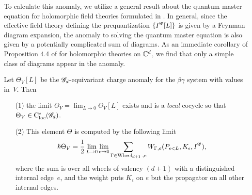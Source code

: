 To calculate this anomaly, we utilize a general result about the quantum master equation for holomorphic field theories formulated in \cite{BWhol}. 
In general, since the effective field theory defining the prequantization $\{I^{\mathscr G}[L]\}$ is given by a Feynman diagram expansion, the anomaly to solving the quantum master equation is also given by a potentially complicated sum of diagrams. 
As an immediate corollary of Proposition 4.4 of \cite{BWhol} for holomorphic theories on $\mathbb C^d$, we find that only a simple class of diagrams appear in the anomaly. 

\begin{lem}\label{lem: obs}
Let $\Theta_V[L]$ be the $\mathscr G_d$-equivariant charge anomaly for the $\beta\gamma$ system with values in~$V$.
Then 
\begin{itemize}
\item[(1)] the limit $\Theta_V = \lim_{L \to 0} \Theta_V[L]$ exists and is a {\em local} cocycle so that $\Theta_V \in {\rm C}_{\rm loc}^*(\mathscr G_d)$.
\item[(2)] This element $\Theta$ is computed by the following limit
\[
\hbar \Theta_V = \frac{1}{2} \lim_{L \to 0} \lim_{\epsilon \to 0} \sum_{\Gamma \in {\rm Wheel}_{d+1} \; , e} W_{\Gamma, e}(P_{\epsilon <L}, K_\epsilon, I^{\mathscr G}) ,
\] 
where the sum is over all wheels of valency $(d+1)$ with a distinguished internal edge~$e$, and the weight puts $K_\epsilon$ on $e$ but the propagator on all other internal edges. 
\end{itemize}
\end{lem}

